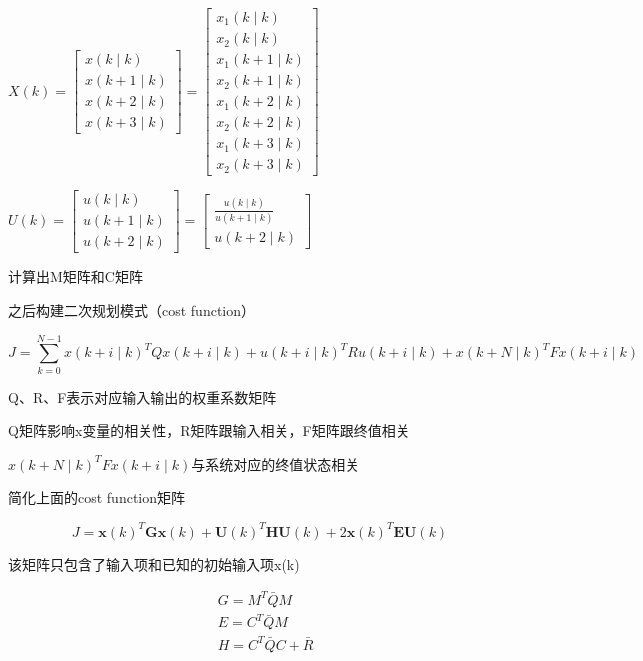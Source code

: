 $X(k)=\left[\begin{array}{c}x(k \mid k) \\x(k+1 \mid k) \\x(k+2 \mid k) \\x(k+3 \mid k)\end{array}\right]=\left[\begin{array}{c}x_{1}(k \mid k) \\x_{2}(k \mid k) \\x_{1}(k+1 \mid k) \\x_{2}(k+1 \mid k) \\x_{1}(k+2 \mid k) \\x_{2}(k+2 \mid k) \\x_{1}(k+3 \mid k) \\x_{2}(k+3 \mid k)\end{array}\right]$

$U(k)=\left[\begin{array}{c}u(k \mid k) \\u(k+1 \mid k) \\u(k+2 \mid k)\end{array}\right]=\left[\begin{array}{c}\frac{u(k \mid k)}{u(k+1 \mid k)} \\u(k+2 \mid k)\end{array}\right]$

计算出M矩阵和C矩阵

之后构建二次规划模式（cost function）

$$
J=\sum_{k=0}^{N-1} x(k+i \mid k)^{T} Q x(k+i \mid k)+u(k+i \mid k)^{T} R u(k+i \mid k)+x(k+N \mid k)^{T} F x(k+i \mid k)
$$

Q、R、F表示对应输入输出的权重系数矩阵

Q矩阵影响x变量的相关性，R矩阵跟输入相关，F矩阵跟终值相关

$x(k+N \mid k)^{T} F x(k+i \mid k)$与系统对应的终值状态相关

简化上面的cost function矩阵

$$
J=\boldsymbol{x}(k)^{T} \boldsymbol{G} \boldsymbol{x}(k)+\boldsymbol{U}(k)^{T} \boldsymbol{H} \boldsymbol{U}(k)+2 \boldsymbol{x}(k)^{T} \boldsymbol{E} \boldsymbol{U}(k)
$$

该矩阵只包含了输入项和已知的初始输入项x(k)

$$
\begin{aligned}&G=M^{T} \bar{Q} M \\&E=C^{T} \bar{Q} M \\&H=C^{T} \bar{Q} C+\bar{R}\end{aligned}
$$

